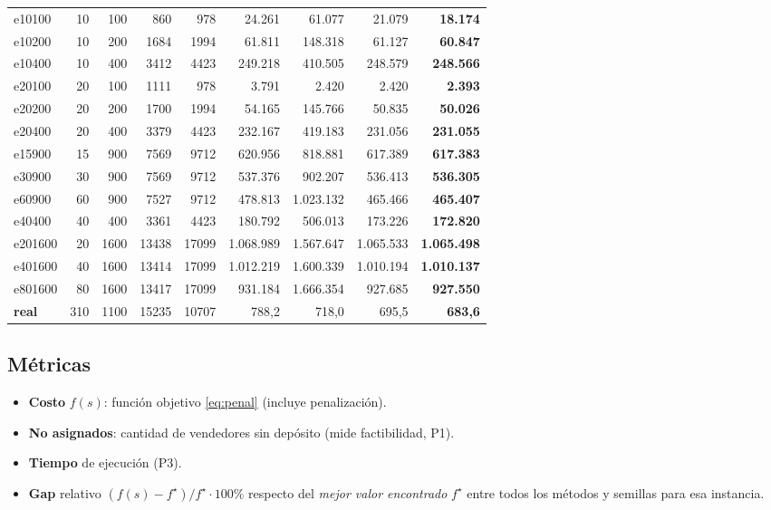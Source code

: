 \documentclass[11pt,a4paper]{article}
\begin{document}
\begin{table}[t]
{\begin{tabular}{l r r r r r r r r}
e10100 & 10 & 100 & 860 & 978 & 24.261 & 61.077 & 21.079 & \textbf{18.174} \\
e10200 & 10 & 200 & 1684 & 1994 & 61.811 & 148.318 & 61.127 & \textbf{60.847} \\
e10400 & 10 & 400 & 3412 & 4423 & 249.218 & 410.505 & 248.579 & \textbf{248.566} \\
e20100 & 20 & 100 & 1111 & 978 & 3.791 & 2.420 & 2.420 & \textbf{2.393} \\
e20200 & 20 & 200 & 1700 & 1994 & 54.165 & 145.766 & 50.835 & \textbf{50.026} \\
e20400 & 20 & 400 & 3379 & 4423 & 232.167 & 419.183 & 231.056 & \textbf{231.055} \\
e15900 & 15 & 900 & 7569 & 9712 & 620.956 & 818.881 & 617.389 & \textbf{617.383} \\
e30900 & 30 & 900 & 7569 & 9712 & 537.376 & 902.207 & 536.413 & \textbf{536.305} \\
e60900 & 60 & 900 & 7527 & 9712 & 478.813 & 1.023.132 & 465.466 & \textbf{465.407} \\
e40400 & 40 & 400 & 3361 & 4423 & 180.792 & 506.013 & 173.226 & \textbf{172.820} \\
e201600 & 20 & 1600 & 13438 & 17099 & 1.068.989 & 1.567.647 & 1.065.533 & \textbf{1.065.498} \\
e401600 & 40 & 1600 & 13414 & 17099 & 1.012.219 & 1.600.339 & 1.010.194 & \textbf{1.010.137} \\
e801600 & 80 & 1600 & 13417 & 17099 & 931.184 & 1.666.354 & 927.685 & \textbf{927.550} \\
\midrule
\textbf{real} & 310 & 1100 & 15235 & 10707 & 788,2 & 718,0 & 695,5 & \textbf{683,6} \\
\bottomrule
\end{tabular}%
}
\end{table}

\subsection{Métricas}
\begin{itemize}
  \item \textbf{Costo} $f(s)$: función objetivo \eqref{eq:penal} (incluye penalización).
  \item \textbf{No asignados}: cantidad de vendedores sin depósito (mide factibilidad, P1).
  \item \textbf{Tiempo} de ejecución (P3).
  \item \textbf{Gap} relativo $(f(s)-f^\star)/f^\star\cdot 100\%$ respecto del \emph{mejor
        valor encontrado} $f^\star$ entre todos los métodos y semillas para esa instancia.
\end{itemize}
\end{document}
